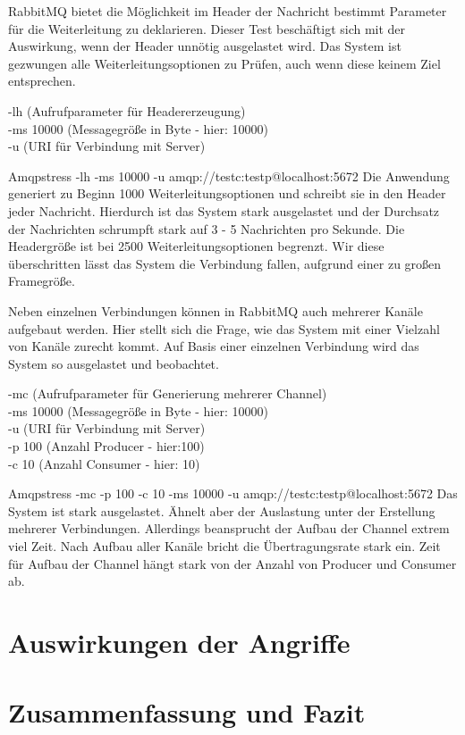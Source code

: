 \documentclass[	a4paper,
			11pt,
			titlepage,
			oneside,
			fleqn,
			listof=totoc,
			parskip,
			chapterprefix=false,
			numbers=noenddot]{scrreprt}
\begin{document}
		{RabbitMQ bietet die Möglichkeit im Header der Nachricht bestimmt Parameter für die Weiterleitung zu deklarieren. Dieser Test beschäftigt sich mit der Auswirkung, wenn der Header unnötig ausgelastet wird. Das System ist gezwungen alle Weiterleitungsoptionen zu Prüfen, auch wenn diese keinem Ziel entsprechen.}%
		{\parbox[c][1.3cm][c]{10.5cm}{-lh (Aufrufparameter für Headererzeugung) \\ -ms 10000 (Messagegröße in Byte - hier: 10000) \\ -u (URI für Verbindung mit Server)}}%
		{Amqpstress -lh -ms 10000 -u amqp://testc:testp@localhost:5672}%
		{Die Anwendung generiert zu Beginn 1000 Weiterleitungsoptionen und schreibt sie in den Header jeder Nachricht. Hierdurch ist das System stark ausgelastet und der Durchsatz der Nachrichten schrumpft stark auf 3 - 5 Nachrichten pro Sekunde.}
		{Die Headergröße ist bei 2500 Weiterleitungsoptionen begrenzt. Wir diese überschritten lässt das System die Verbindung fallen, aufgrund einer zu großen Framegröße.}
		
		
		{Neben einzelnen Verbindungen können in RabbitMQ auch mehrerer Kanäle aufgebaut werden. Hier stellt sich die Frage, wie das System mit einer Vielzahl von Kanäle zurecht kommt. Auf Basis einer einzelnen Verbindung wird das System so ausgelastet und beobachtet. }%
		{\parbox[c][2cm][c]{10.5cm}{-mc (Aufrufparameter für Generierung mehrerer Channel) \\ -ms 10000 (Messagegröße in Byte - hier: 10000) \\ -u (URI für Verbindung mit Server) \\ -p 100 (Anzahl Producer - hier:100) \\ -c 10 (Anzahl Consumer - hier: 10)}}%
		{Amqpstress -mc -p 100 -c 10 -ms 10000 -u amqp://testc:testp@localhost:5672}%
		{Das System ist stark ausgelastet. Ähnelt aber der Auslastung unter der Erstellung mehrerer Verbindungen. Allerdings beansprucht  der Aufbau der Channel extrem viel Zeit. Nach Aufbau aller Kanäle bricht die Übertragungsrate stark ein.}
		{Zeit für Aufbau der Channel hängt stark von der Anzahl von Producer und Consumer ab.}

	
	\clearpage
	\section*{Auswirkungen der Angriffe}
	
	
	
	\clearpage
	\section*{Zusammenfassung und Fazit}
\end{document}
